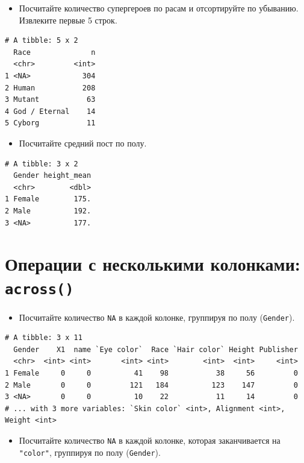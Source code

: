\documentclass[
]{book}
\providecommand{\tightlist}{%
  \setlength{\itemsep}{0pt}\setlength{\parskip}{0pt}}
\begin{document}
\begin{itemize}
\tightlist
\item
  Посчитайте количество супергероев по расам и отсортируйте по убыванию. Извлеките первые 5 строк.
\end{itemize}

\begin{verbatim}
# A tibble: 5 x 2
  Race              n
  <chr>         <int>
1 <NA>            304
2 Human           208
3 Mutant           63
4 God / Eternal    14
5 Cyborg           11
\end{verbatim}

\begin{itemize}
\tightlist
\item
  Посчитайте средний пост по полу.
\end{itemize}

\begin{verbatim}
# A tibble: 3 x 2
  Gender height_mean
  <chr>        <dbl>
1 Female        175.
2 Male          192.
3 <NA>          177.
\end{verbatim}

\hypertarget{task_across}{%
\section{\texorpdfstring{Операции с несколькими колонками: \texttt{across()}}{Операции с несколькими колонками: across()}}\label{task_across}}

\begin{itemize}
\tightlist
\item
  Посчитайте количество \texttt{NA} в каждой колонке, группируя по полу (\texttt{Gender}).
\end{itemize}

\begin{verbatim}
# A tibble: 3 x 11
  Gender    X1  name `Eye color`  Race `Hair color` Height Publisher
  <chr>  <int> <int>       <int> <int>        <int>  <int>     <int>
1 Female     0     0          41    98           38     56         0
2 Male       0     0         121   184          123    147         0
3 <NA>       0     0          10    22           11     14         0
# ... with 3 more variables: `Skin color` <int>, Alignment <int>, Weight <int>
\end{verbatim}

\begin{itemize}
\tightlist
\item
  Посчитайте количество \texttt{NA} в каждой колонке, которая заканчивается на \texttt{"color"}, группируя по полу (\texttt{Gender}).
\end{itemize}
\end{document}
